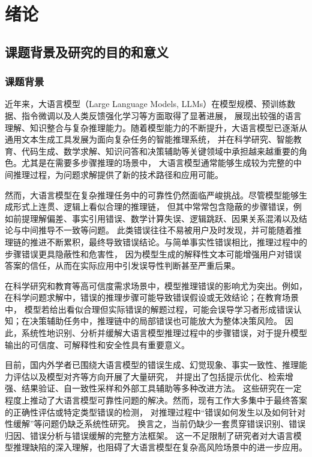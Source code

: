 
\chapter{绪\hspace{1em}论}
\section{课题背景及研究的目的和意义}
\subsection{课题背景}

近年来，大语言模型（Large Language Models, LLMs）在模型规模、预训练数据、指令微调以及人类反馈强化学习等方面取得了显著进展，
展现出较强的语言理解、知识整合与复杂推理能力。随着模型能力的不断提升，大语言模型已逐渐从通用文本生成工具发展为面向复杂任务的智能推理系统，
并在科学研究、智能教育、代码生成、数学求解、知识问答和决策辅助等关键领域中承担越来越重要的角色。尤其是在需要多步骤推理的场景中，
大语言模型通常能够生成较为完整的中间推理过程，为问题求解提供了新的技术路径和应用可能。

然而，大语言模型在复杂推理任务中的可靠性仍然面临严峻挑战。尽管模型能够生成形式上连贯、逻辑上看似合理的推理链，
但其中常常包含隐蔽的步骤错误，例如前提理解偏差、事实引用错误、数学计算失误、逻辑跳跃、因果关系混淆以及结论与中间推导不一致等问题。
此类错误往往不易被用户及时发现，并可能随着推理链的推进不断累积，最终导致错误结论。与简单事实性错误相比，推理过程中的步骤错误更具隐蔽性和危害性，
因为模型生成的解释性文本可能增强用户对错误答案的信任，从而在实际应用中引发误导性判断甚至严重后果。

在科学研究和教育等高可信度需求场景中，模型推理错误的影响尤为突出。例如，在科学问题求解中，错误的推理步骤可能导致错误假设或无效结论；在教育场景中，
模型若给出看似合理但实际错误的解题过程，可能会误导学习者形成错误认知；在决策辅助任务中，推理链中的局部错误也可能放大为整体决策风险。
因此，系统性地识别、分析并缓解大语言模型推理过程中的步骤错误，对于提升模型输出的可信度、可解释性和安全性具有重要意义。

目前，国内外学者已围绕大语言模型的错误生成、幻觉现象、事实一致性、推理能力评估以及模型对齐等方向开展了大量研究\cite{ref01_huang2025survey,ref02_che2023nlp}，
并提出了包括提示优化、检索增强、结果验证、自一致性采样和外部工具辅助等多种改进方法。
这些研究在一定程度上推动了大语言模型可靠性问题的解决。然而，现有工作大多集中于最终答案的正确性评估或特定类型错误的检测，
对推理过程中“错误如何发生以及如何针对性缓解”等问题仍缺乏系统性研究。
换言之，当前仍缺少一套贯穿错误识别、错误归因、错误分析与错误缓解的完整方法框架。
这一不足限制了研究者对大语言模型推理缺陷的深入理解，也阻碍了大语言模型在复杂高风险场景中的进一步应用。

